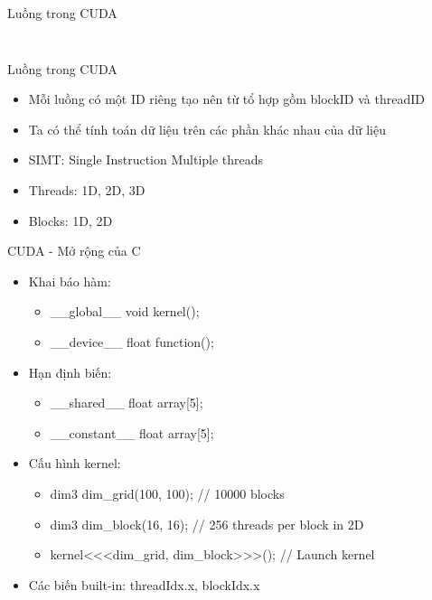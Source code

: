 \documentclass[10pt]{beamer}
\theoremstyle{remark}
\numberwithin{algocf}{section}
\numberwithin{equation}{section}
\numberwithin{dl}{section}
\numberwithin{figure}{section}
\begin{document}
\begin{frame}{Luồng trong CUDA}
\begin{columns}[onlytextwidth]
\begin{column}{0.5\linewidth}
\begin{figure}[H]
            \end{figure}
        \end{column}
    \end{columns}
\end{frame}

\begin{frame}{Luồng trong CUDA}
    \begin{itemize}
        \item Mỗi luồng có một ID riêng tạo nên từ tổ hợp gồm blockID và threadID
        \item Ta có thể tính toán dữ liệu trên các phần khác nhau của dữ liệu
        \item SIMT: Single Instruction Multiple threads
        \item Threads: 1D, 2D, 3D
        \item Blocks: 1D, 2D
    \end{itemize}
\end{frame}

\begin{frame}{CUDA - Mở rộng của C}
    \begin{itemize}
        \item Khai báo hàm:
        \begin{itemize}
            \item \_\_global\_\_ void kernel();
            \item \_\_device\_\_ float function();
        \end{itemize}
        \item Hạn định biến:
        \begin{itemize}
            \item \_\_shared\_\_ float array[5];
            \item \_\_constant\_\_ float array[5];
        \end{itemize}
        \item Cấu hình kernel:
        \begin{itemize}
            \item dim3 dim\_grid(100, 100); // 10000 blocks
            \item dim3 dim\_block(16, 16); // 256 threads per block in 2D
            \item kernel<<<dim\_grid, dim\_block>>>(); // Launch kernel
        \end{itemize}
        \item Các biến built-in: threadIdx.x, blockIdx.x
    \end{itemize}
\end{frame}
\end{document}
